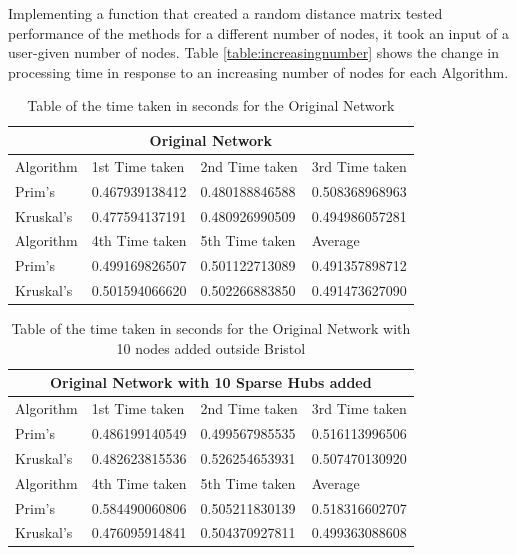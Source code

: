 \documentclass[twocolumn]{article}
\begin{document}
Implementing a function that created a random distance matrix tested performance of the methods for a different number of nodes, it took an input of a user-given number of nodes. Table \ref{table:increasingnumber} shows the change in processing time in response to an increasing number of nodes for each Algorithm.


\begin{table}[H]
\caption{Table of the time taken in seconds for the Original Network}
\label{table:ON}
\centering
\tiny
\begin{tabular}{|l|l|l|l|}
\toprule
\multicolumn{4}{c}{\textbf{Original Network}}\\
\midrule
Algorithm & 1st Time taken & 2nd Time taken & 3rd Time taken \\
\hline
Prim's & 0.467939138412 & 0.480188846588 & 0.508368968963 \\
\hline
Kruskal's & 0.477594137191 & 0.480926990509 & 0.494986057281 \\
\hline
Algorithm & 4th Time taken & 5th Time taken & Average \\
\hline
Prim's & 0.499169826507 & 0.501122713089 & \color{teal}0.491357898712 \\
\hline
Kruskal's & 0.501594066620 & 0.502266883850 & 0.491473627090 \\
\bottomrule
\end{tabular}
\label{tab:tableone}
\end{table}

\begin{table}[H]
\caption{Table of the time taken in seconds for the Original Network with 10 nodes added outside Bristol}
\label{table:outsideBristol}
\centering
\tiny
\begin{tabular}{|l|l|l|l|}
\toprule
\multicolumn{4}{c}{\textbf{Original Network with 10 Sparse Hubs added}} \\
\midrule
Algorithm & 1st Time taken & 2nd Time taken & 3rd Time taken \\
\hline
Prim's & 0.486199140549 & 0.499567985535 & 0.516113996506 \\
\hline
Kruskal's & 0.482623815536 & 0.526254653931 & 0.507470130920 \\
\hline
Algorithm & 4th Time taken & 5th Time taken & Average \\
\hline
Prim's & 0.584490060806 & 0.505211830139 & 0.518316602707 \\
\hline
Kruskal's & 0.476095914841 & 0.504370927811 & \color{teal}0.499363088608 \\
\bottomrule
\end{tabular}
\end{table}
\end{document}

